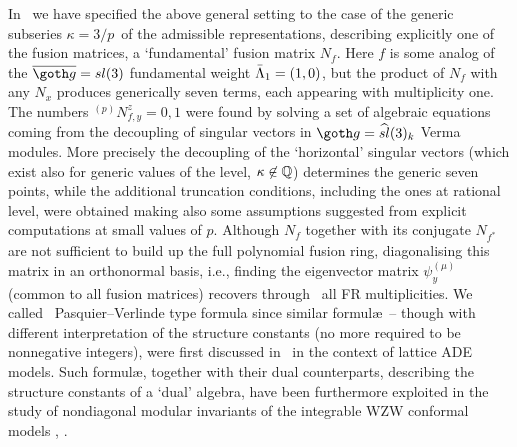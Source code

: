 In \FGP\ we have specified the above general setting to the case
of the generic subseries $\kappa=3/p\,$ of the admissible
representations, describing explicitly one of the fusion
matrices, a `fundamental' fusion matrix $N_f$. Here $f$ is some
analog of the $\bgo= sl(3)$ fundamental weight $\bar{\Lambda}_1=(1,0)$, but
the  product of $N_f$ with any  $N_x$ produces generically seven
terms, each appearing with multiplicity one.  The numbers
${}^{(p)}N_{f,y}^z=0,1$ were found by solving a set of  algebraic
equations coming from the decoupling of singular vectors in
$\go=\widehat{sl}(3)_k$ Verma modules. More precisely the
decoupling of the `horizontal' singular vectors (which exist also
for generic values of the level, $\kappa\not\in {\Bbb Q}$) determines
the generic seven points, while the additional truncation
conditions, including the ones at rational level, were obtained
making also some assumptions suggested from explicit computations
at small values of $p$.  Although  $N_f$ together with its
conjugate $N_{f^*}$ are  not sufficient to build up the full
polynomial fusion ring, diagonalising this matrix  in an
orthonormal basis, i.e., finding the  eigenvector matrix
$\psi_y^{(\mu)} $  (common to all fusion matrices) recovers
through \pasv\ all  FR multiplicities.  We called  \pasv\
Pasquier--Verlinde type formula since similar formul\ae\ --
though with different interpretation of the structure constants
(no more required to be nonnegative integers), were  first
discussed in \Pas\ in the context of lattice ADE models. Such
formul\ae, together with their dual counterparts, describing the
structure constants of a `dual' algebra, have been furthermore
exploited in the study of nondiagonal modular invariants of the
integrable WZW conformal models \DFZ, \PZ. 



